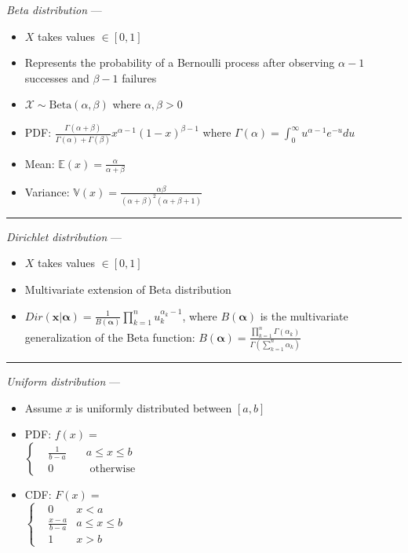 \emph{Beta distribution} ---
\begin{itemize}
    \item $X$ takes values $\in [0,1]$
    \item Represents the probability of a Bernoulli process after observing $\alpha-1$ successes and $\beta-1$ failures
\end{itemize}
\begin{multicols}{2}
\begin{itemize}
    \item $\mathcal{X} \sim \textrm{Beta}(\alpha,\beta)$ where $\alpha,\beta > 0$
    \item PDF: $\frac{\Gamma(\alpha+\beta)}{\Gamma(\alpha)+\Gamma(\beta)} x^{\alpha-1} (1-x)^{\beta-1}$
    where $\Gamma(\alpha) = \int_0^\infty u^{\alpha-1} e^{-u} du$
    \item Mean: $\mathbb{E}(x) = \frac{\alpha}{\alpha+\beta}$
    \item Variance: $\mathbb{V}(x) = \frac{\alpha\beta}{(\alpha+\beta)^2(\alpha+\beta+1)}$
\end{itemize}
\end{multicols}

{\color{lightgray}\hrule height 0.001mm}

\emph{Dirichlet distribution} ---
\begin{itemize}
    \item $X$ takes values $\in [0,1]$
    \item Multivariate extension of Beta distribution
    \item $Dir(\boldsymbol{x} | \boldsymbol{\alpha}) = \frac{1}{B(\boldsymbol{\alpha})} \prod_{k=1}^n u_k^{\alpha_k - 1}$,
    where $B(\boldsymbol{\alpha})$ is the multivariate generalization of the Beta function:
    $B(\boldsymbol{\alpha}) = \frac{\prod_{k=1}^n \Gamma(\alpha_k)}{\Gamma\left(\sum_{k=1}^n \alpha_k\right)}$
\end{itemize}

{\color{lightgray}\hrule height 0.001mm}

\emph{Uniform distribution} ---
\begin{multicols}{2}
\begin{itemize}
    \item Assume $x$ is uniformly distributed between $[a,b]$
    \item PDF: $f(x) =$\\
        $\left\{
            \begin{aligned}
                 & \frac{1}{b-a} \quad & a \leq x \leq b \\
                 & 0 & \textrm{ otherwise}
            \end{aligned}
        \right.$
    \item CDF: $F(x) =$\\
        $\left\{
            \begin{aligned}
                 & 0 & x < a \\
                 & \frac{x-a}{b-a} & a \leq x \leq b \\
                 & 1 & x > b
            \end{aligned}
        \right.$
\end{itemize}
\end{multicols}

